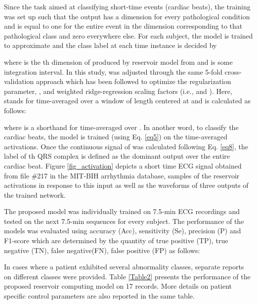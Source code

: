 \documentclass[review]{elsarticle}
\begin{document}
Since the task aimed at classifying short-time events (cardiac beats), the training was set up such that the output  has a dimension for every pathological condition and  is equal to one for the entire event in the dimension corresponding to that pathological class and zero everywhere else. For each subject, the model is trained to approximate  and the class label at each time instance is decided by 

where  is the th dimension of  produced by reservoir model from  and  is some integration interval. In this study,  was adjusted through the same 5-fold cross-validation approach which has been followed to optimize the regularization parameter, , and weighted ridge-regression scaling factors (i.e.,  and ). Here,  stands for  time-averaged over a window of length  centered at  and is calculated as follows:

where  is a shorthand for  time-averaged over . In another word, to classify the cardiac beats, the model is trained (using Eq. \ref{eq5}) on the time-averaged activations. Once the continuous signal of  was calculated following Eq. \ref{eq8}, the label of th QRS complex is defined as the dominant output over the entire cardiac beat. Figure \ref{fig_activation} depicts a short time ECG signal obtained from file \#217 in the MIT-BIH arrhythmia database, samples of the reservoir activations in response to this input as well as the waveforms of three outputs of the trained network. 

The proposed model was individually trained on 7.5-min ECG recordings and tested on the next 7.5-min sequences for every subject. The performance of the models was evaluated using accuracy (Acc), sensitivity (Se), precision (P) and F1-score which are determined by the quantity of true positive (TP), true negative (TN), false negative(FN), false positive (FP) as follows:

 

In cases where a patient exhibited several abnormality classes, separate reports on different classes were provided.  
Table \ref{Table2} presents the performance of the proposed reservoir computing model on 17 records. More details on patient specific control parameters are also reported in the same table.
\end{document}
